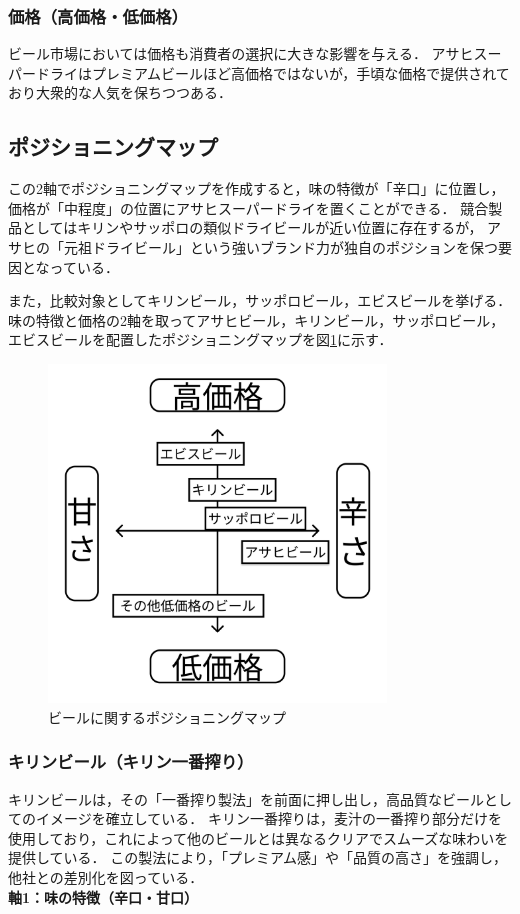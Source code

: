 \documentclass[titlepage,a4paper]{jsarticle}
\begin{document}
\subsubsection{価格（高価格・低価格）}
ビール市場においては価格も消費者の選択に大きな影響を与える．
アサヒスーパードライはプレミアムビールほど高価格ではないが，手頃な価格で提供されており大衆的な人気を保ちつつある．

\subsection{ポジショニングマップ}
この2軸でポジショニングマップを作成すると，味の特徴が「辛口」に位置し，価格が「中程度」の位置にアサヒスーパードライを置くことができる．
競合製品としてはキリンやサッポロの類似ドライビールが近い位置に存在するが，
アサヒの「元祖ドライビール」という強いブランド力が独自のポジションを保つ要因となっている．

また，比較対象としてキリンビール，サッポロビール，エビスビールを挙げる．
味の特徴と価格の2軸を取ってアサヒビール，キリンビール，サッポロビール，エビスビールを配置したポジショニングマップを図\ref{map}に示す．
\begin{figure}[H]
  \centering
  \includegraphics[width=0.8\textwidth]{img/pMap.png}
  \caption{ビールに関するポジショニングマップ}
  \label{map}
\end{figure}

\subsubsection{キリンビール（キリン一番搾り）}
キリンビールは，その「一番搾り製法」を前面に押し出し，高品質なビールとしてのイメージを確立している．
キリン一番搾りは，麦汁の一番搾り部分だけを使用しており，これによって他のビールとは異なるクリアでスムーズな味わいを提供している．
この製法により，「プレミアム感」や「品質の高さ」を強調し，他社との差別化を図っている．
\\\textbf{軸1：味の特徴（辛口・甘口）}
\end{document}
